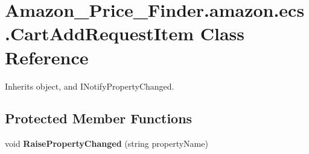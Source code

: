 \hypertarget{class_amazon___price___finder_1_1amazon_1_1ecs_1_1_cart_add_request_item}{\section{Amazon\-\_\-\-Price\-\_\-\-Finder.\-amazon.\-ecs.\-Cart\-Add\-Request\-Item Class Reference}
\label{class_amazon___price___finder_1_1amazon_1_1ecs_1_1_cart_add_request_item}
}


 




Inherits object, and I\-Notify\-Property\-Changed.

\subsection*{Protected Member Functions}
\begin{DoxyCompactItemize}
\item 
\hypertarget{class_amazon___price___finder_1_1amazon_1_1ecs_1_1_cart_add_request_item_a6b4dd8e5ce1777d262d514d087d6a359}{void {\bfseries Raise\-Property\-Changed} (string property\-Name)}\label{class_amazon___price___finder_1_1amazon_1_1ecs_1_1_cart_add_request_item_a6b4dd8e5ce1777d262d514d087d6a359}

\end{DoxyCompactItemize}
